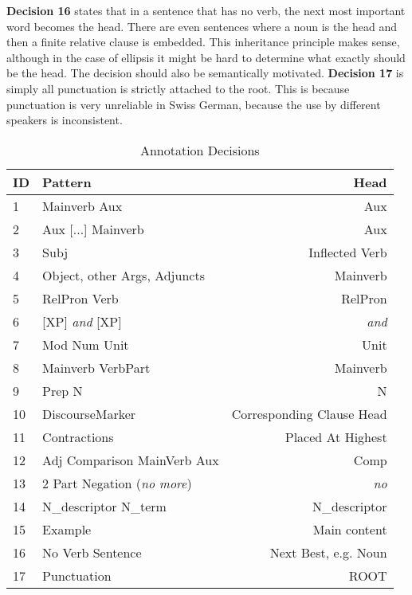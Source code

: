 \documentclass[11pt,letterpaper, covington]{article}
\begin{document}
\textbf{Decision 16} states that in a sentence that has no verb, the next most important word becomes the head. There are even sentences where a noun is the head and then a finite relative clause is embedded. This inheritance principle makes sense, although in the case of ellipsis it might be hard to determine what exactly should be the head. The decision should also be semantically motivated.
\textbf{Decision 17} is simply all punctuation is strictly attached to the root. This is because punctuation is very unreliable in Swiss German, because the use by different speakers is inconsistent.

 \begin{table}
\center
\begin{tabular}{ | l | l | r | }
   \hline
   \textbf{ID} & \textbf{Pattern} & \textbf{Head} \\ \hline
   1 & Mainverb Aux & Aux \\
   2 & Aux [...] Mainverb & Aux  \\ 
   3 & Subj & Inflected Verb  \\
   4 & Object, other Args, Adjuncts & Mainverb \\
   5 & RelPron Verb & RelPron \\
   6 & [XP] \emph{and} [XP] & \emph{and} \\
   7 & Mod Num Unit & Unit  \\
   8 & Mainverb VerbPart & Mainverb \\
   9 & Prep N &  N \\
   10 & DiscourseMarker & Corresponding Clause Head \\
   11 & Contractions & Placed At Highest \\
   12 & Adj Comparison MainVerb Aux & Comp \\
   13 & 2 Part Negation (\emph{no more}) & \emph{no}  \\
   14 & N\_descriptor N\_term & N\_descriptor \\
   15 & Example & Main content \\
   16 & No Verb Sentence & Next Best, e.g. Noun \\
   17 & Punctuation & ROOT\\ \hline
\end{tabular}
\caption{Annotation Decisions}
\label{tab:dec}
\end{table}
\end{document}
